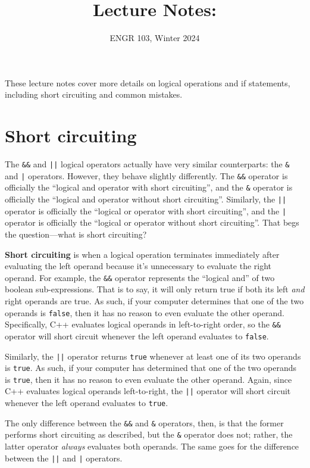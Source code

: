 \documentclass{article}
\title{
    Lecture Notes: \lecturetitle
}
\author{ENGR 103, Winter 2024}
\date{}
\begin{document}
\maketitle

These lecture notes cover more details on logical operations and if statements, including short circuiting and common mistakes.

\section{Short circuiting}

The \texttt{\&\&} and \texttt{||} logical operators actually have very similar counterparts: the \texttt{\&} and \texttt{|} operators. However, they behave slightly differently. The \texttt{\&\&} operator is officially the ``logical and operator with short circuiting'', and the \texttt{\&} operator is officially the ``logical and operator without short circuiting''. Similarly, the \texttt{||} operator is officially the ``logical or operator with short circuiting'', and the \texttt{|} operator is officially the ``logical or operator without short circuiting''. That begs the question---what is short circuiting?

\textbf{Short circuiting} is when a logical operation terminates immediately after evaluating the left operand because it's unnecessary to evaluate the right operand. For example, the \texttt{\&\&} operator represents the ``logical and'' of two boolean sub-expressions. That is to say, it will only return true if both its left \textit{and} right operands are true. As such, if your computer determines that one of the two operands is \texttt{false}, then it has no reason to even evaluate the other operand. Specifically, C++ evaluates logical operands in left-to-right order, so the \texttt{\&\&} operator will short circuit whenever the left operand evaluates to \texttt{false}.

Similarly, the \texttt{||} operator returns \texttt{true} whenever at least one of its two operands is \texttt{true}. As such, if your computer has determined that one of the two operands is \texttt{true}, then it has no reason to even evaluate the other operand. Again, since C++ evaluates logical operands left-to-right, the \texttt{||} operator will short circuit whenever the left operand evaluates to \texttt{true}.

The only difference between the \texttt{\&\&} and \texttt{\&} operators, then, is that the former performs short circuiting as described, but the \texttt{\&} operator does not; rather, the latter operator \textit{always} evaluates both operands. The same goes for the difference between the \texttt{||} and \texttt{|} operators.
\end{document}
